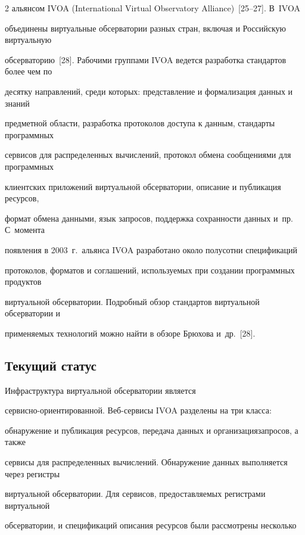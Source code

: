 \begin{multicols}{2}
альянсом IVOA ({International Virtual Observatory Alliance})~[25--27]. В~IVOA 

объединены виртуальные обсерватории разных стран, включая и Российскую виртуальную 

обсерваторию~[28]. Рабочими группами IVOA ведется разработка стандартов более чем по 

десятку направлений, среди которых: представление и формализация данных и знаний 

предметной области, разработка протоколов доступа к данным, стандарты программных 

сервисов для распределенных вычислений, протокол обмена сообщениями для программных 

клиентских приложений виртуальной обсерватории, описание и публикация ресурсов, 

формат обмена данными, язык запросов, поддержка сохранности данных и~пр. С~момента 

появления в 2003~г.\ альянса IVOA разработано около полусотни спецификаций 

протоколов, форматов и соглашений, используемых при создании программных продуктов 

виртуальной обсерватории. Подробный обзор стандартов виртуальной обсерватории и 

применяемых технологий можно найти в обзоре Брюхова и~др.~[28].



\vspace*{-2pt}



\subsection{Текущий статус}



      Инфраструктура виртуальной обсерватории является 

сер\-вис\-но-ориен\-ти\-ро\-ван\-ной. Веб-сер\-ви\-сы IVOA разделены на три класса: 

обнаружение и пуб\-ликация ресурсов, передача данных и организация\linebreak запросов, а также 

сервисы для распределенных вычислений. Обнаружение данных выполняется через регистры 

виртуальной обсерватории. Для сервисов, предоставляемых регистрами виртуальной 

обсерватории, и спецификаций описания ресурсов были рассмотрены несколько 


\end{multicols}
